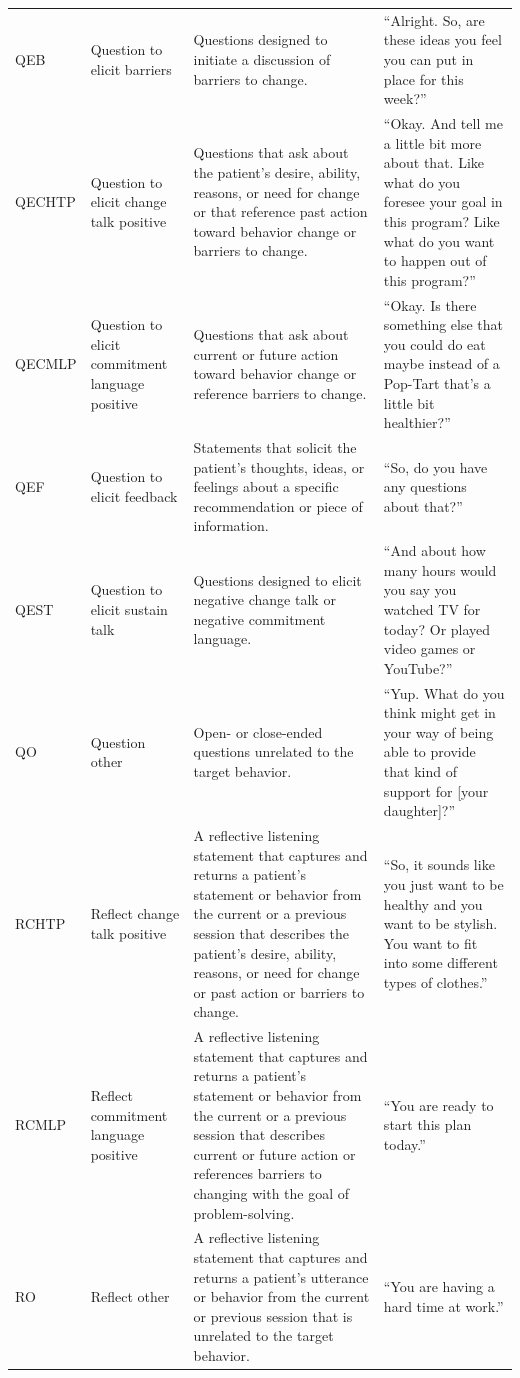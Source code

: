 \documentclass[smallextended]{svjour3}       %
\begin{document}
\begin{small}
\begin{longtable}{p{1.3cm}p{2cm}p{5cm}p{4.8cm}}
QEB & Question to elicit barriers & Questions designed to initiate a discussion of barriers to change. & ``Alright.  So, are these ideas you feel you can put in place for this week?''\\
QECHTP & Question to elicit change talk positive & Questions that ask about the patient's desire, ability, reasons, or need for change or that reference past action toward behavior change or barriers to change. & ``Okay.  And tell me a little bit more about that.  Like what do you foresee your goal in this program?  Like what do you want to happen out of this program?''\\
QECMLP & Question to elicit commitment language positive & Questions that ask about current or future action toward behavior change or reference barriers to change. & ``Okay.  Is there something else that you could do eat maybe instead of a Pop-Tart that's a little bit healthier?''\\
QEF & Question to elicit feedback & Statements that solicit the patient's thoughts, ideas, or feelings about a specific recommendation or piece of information. & ``So, do you have any questions about that?''\\
QEST & Question to elicit sustain talk & Questions designed to elicit negative change talk or negative commitment language. & ``And about how many hours would you say you watched TV for today?  Or played video games or YouTube?''\\
QO & Question other & Open- or close-ended questions unrelated to the target behavior. & ``Yup. What do you think might get in your way of being able to provide that kind of support for [your daughter]?''\\
RCHTP & Reflect change talk positive & A reflective listening statement that captures and returns a patient's statement or behavior from the current or a previous session that describes the patient's desire, ability, reasons, or need for change or past action or barriers to change. & ``So, it sounds like you just want to be healthy and you want to be stylish. You want to fit into some different types of clothes.''\\
RCMLP & Reflect commitment language positive & A reflective listening statement that captures and returns a patient's statement or behavior from the current or a previous session that describes current or future action or references barriers to changing with the goal of problem-solving. & ``You are ready to start this plan today.''\\
RO & Reflect other & A reflective listening statement that captures and returns a patient's utterance or behavior from the current or previous session that is unrelated to the target behavior. & ``You are having a hard time at work.''\\

\end{longtable}
\end{small}
\end{document}
